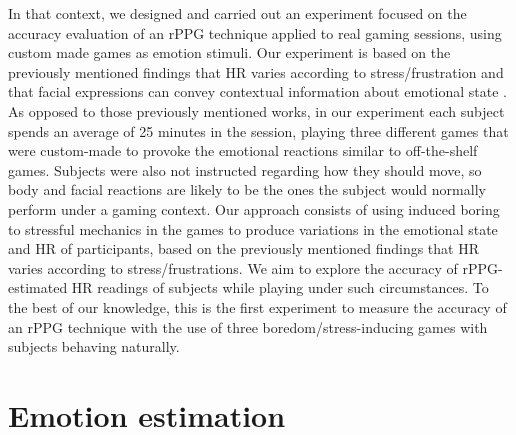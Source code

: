 In that context, we designed and carried out an experiment focused on the accuracy evaluation of an rPPG technique applied to real gaming sessions, using custom made games as emotion stimuli. Our experiment is based on the previously mentioned findings that HR varies according to stress/frustration and that facial expressions can convey contextual information about emotional state \parencite{giannakakis2017stress}. As opposed to those previously mentioned works, in our experiment each subject spends an average of 25 minutes in the session, playing three different games that were custom-made to provoke the emotional reactions similar to off-the-shelf games. Subjects were also not instructed regarding how they should move, so body and facial reactions are likely to be the ones the subject would normally perform under a gaming context. Our approach consists of using induced boring to stressful mechanics in the games to produce variations in the emotional state and HR of participants, based on the previously mentioned findings that HR varies according to stress/frustrations. We aim to explore the accuracy of rPPG-estimated HR readings of subjects while playing under such circumstances. To the best of our knowledge, this is the first experiment to measure the accuracy of an rPPG technique with the use of three boredom/stress-inducing games with subjects behaving naturally.

\section{Emotion estimation}
